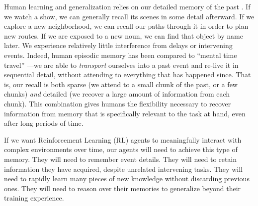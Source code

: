 \documentclass{article}
\begin{document}
Human learning and generalization relies on our detailed memory of the past \citep{tulving1985memory,suddendorf2009mental, hasson2015hierarchical,kumaran2016learning,NGO2021}.  If we watch a show, we can generally recall its scenes in some detail afterward. If we explore a new neighborhood, we can recall our paths through it in order to plan new routes. If we are exposed to a new noun, we can find that object by name later. We experience relatively little interference from delays or intervening events. Indeed, human episodic memory has been compared to ``mental time travel'' \citep{tulving1985memory,suddendorf2009mental,manning2021episodic}---we are able to \emph{transport} ourselves into a past event and re-live it in sequential detail, without attending to everything that has happened since. That is, our recall is both sparse (we attend to a small chunk of the past, or a few chunks) \emph{and} detailed (we recover a large amount of information from each chunk). This combination gives humans the flexibility necessary to recover information from memory that is specifically relevant to the task at hand, even after long periods of time.

If we want Reinforcement Learning (RL) agents to meaningfully interact with complex environments over time, our agents will need to achieve this type of memory. They will need to remember event details. They will need to retain information they have acquired, despite unrelated intervening tasks. They will need to rapidly learn many pieces of new knowledge without discarding previous ones. They will need to reason over their memories to generalize beyond their training experience. 
\end{document}
